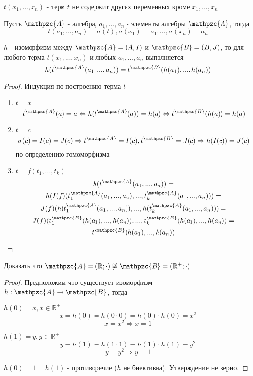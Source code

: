 \documentclass[../main/document.tex]{subfiles}
\begin{document}
\begin{dfn}
$t(x_1,...,x_n)$ - терм $t$ не содержит других переменных кроме $x_1,...,x_n$
\end{dfn}
\begin{dfn}
Пусть $\mathpzc{A}$ - алгебра, $a_1,...,a_n$ - элементы алгебры $\mathpzc{A}$, тогда
$$t(a_1,...,a_n)=\sigma(t), \sigma(x_1)=a_1,...,\sigma(x_n)=a_n$$
\end{dfn}
\begin{thm}
$h$ - изоморфизм между $\mathpzc{A}=(A,I)$ и $\mathpzc{B}=(B,J)$, то для любого терма $t(x_1,...,x_n)$ и любых $a_1,...,a_n$ выполняется
$$h(t^{\mathpzc{A}}(a_1,...,a_n))=t^{\mathpzc{B}}(h(a_1),...,h(a_n))$$
\end{thm}
\begin{proof}
Индукция по построению терма $t$
\begin{enumerate}
\item $t=x$
$$t^{\mathpzc{A}}(a)=a\Leftrightarrow h(t^{\mathpzc{A}}(a))=h(a)\Leftrightarrow t^{\mathpzc{B}}(h(a))=h(a)$$
\item $t=c$
$$\sigma(c)=I(c)=J(c)\Rightarrow t^{\mathpzc{A}}=I(c), t^{\mathpzc{B}}=J(c)\Rightarrow h(I(c))=J(c)$$
по определению гомоморфизма
\item $t=f(t_1,...,t_k)$
\begin{multline*}
h(t^{\mathpzc{A}}(a_1,...,a_n))=\\
h(I(f)(t^{\mathpzc{A}}_{1}(a_1,...,a_n),...,t^{\mathpzc{A}}_{k}(a_1,...,a_n)))=\\
J(f)(h(t^{\mathpzc{A}}_{1}(a_1,...,a_n)),...,h(t^{\mathpzc{A}}_{k}(a_1,...,a_n)))=\\
J(f)(t^{\mathpzc{B}}_{1}(h(a_1),...,h(a_n)),...,t^{\mathpzc{B}}_{k}(h(a_1),...,h(a_n))=\\
t^{\mathpzc{B}}(h(a_1),...,h(a_n))
\end{multline*}
\end{enumerate}
\end{proof}
\begin{exm}
Доказать что $\mathpzc{A}=(\mathbb{R};\cdot)\not\cong\mathpzc{B}=(\mathbb{R}^{+};\cdot)$
\begin{proof}
Предположим что существует изоморфизм $h:\mathpzc{A}\rightarrow \mathpzc{B}$, тогда

$h(0)=x, x\in \mathbb{R}^{+}$
$$x=h(0)=h(0\cdot 0)=h(0)\cdot h(0)=x^2$$
$$x=x^2\Rightarrow x=1$$

$h(1)=y, y\in \mathbb{R}^{+} $
$$y=h(1)=h(1\cdot 1)=h(1)\cdot h(1)=y^2$$
$$y=y^2\Rightarrow y=1$$

$h(0)=1=h(1)$ - противоречие ($h$ не биективна). Утверждение не верно.
\end{proof}
\end{exm}
\end{document}
